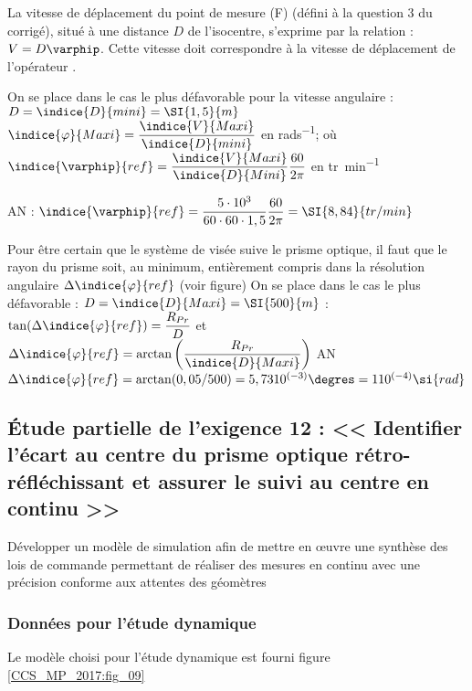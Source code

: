 \ifprof
\begin{corrige}
La vitesse de déplacement du point de mesure (F) (défini à la question 3 du corrigé), situé à une distance $D$ de l’isocentre, s’exprime par la relation : $V=D\varphip$. Cette vitesse doit correspondre à la vitesse de déplacement de l’opérateur .

On se place dans le cas le plus défavorable pour la vitesse angulaire : $D=\indice{D}{mini} = \SI{1,5}{m}$ 
$\indice{\varphi}{Maxi} = \dfrac{\indice{V}{Maxi}}{\indice{D}{mini}}$ en \si{rads^{-1}};  où 
$\indice{\varphip}{ref} = \dfrac{\indice{V}{Maxi}}{\indice{D}{Mini}} \dfrac{60}{2\pi}$ en \si{tr.min^{-1}}

AN : $\indice{\varphip}{ref} = \dfrac{5\cdot 10^3 }{60\cdot 60\cdot 1,5} \dfrac{60}{2\pi} =\SI{8,84}{tr/min}$

Pour être certain que le système de visée suive le prisme optique, il faut que le rayon du prisme soit, au minimum, entièrement compris dans la résolution angulaire $\Delta \indice{\varphi}{ref}$ (voir figure)
On se place dans le cas le plus défavorable : $D=\indice{D}{Maxi} =\SI{500}{m}$ :  
$\tan(\Delta \indice{\varphi}{ref})=\dfrac{R_{Pr}}{D}$ et $\Delta \indice{\varphi}{ref}=\arctan\left(\dfrac{R_{Pr}}{\indice{D}{Maxi}}\right)$
AN  $\Delta \indice{\varphi}{ref}=\arctan(0,05/500)=5,7310^{(-3)}\degres =110^{(-4)} \si{rad}$

\end{corrige}
\else
\fi


\subsection{Étude partielle de l'exigence 12 : << Identifier l'écart au centre du prisme optique rétro-réfléchissant et assurer le suivi au centre en continu >>}

\ifprof
\else
\begin{obj}
Développer un modèle de simulation afin de mettre en œuvre une synthèse des lois de commande permettant de réaliser des mesures en continu avec une précision conforme aux attentes des géomètres
\end{obj}

\subsubsection{Données pour l'étude dynamique}
Le modèle choisi pour l'étude dynamique est fourni figure \ref{CCS_MP_2017:fig_09} \\


